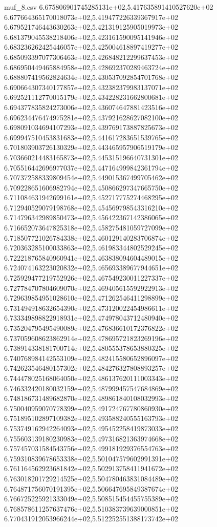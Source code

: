 \begin{filecontents*}{muf_8.csv}
6.675806901745285131e+02,5.417635891410527620e+02
6.677664365170018073e+02,5.419477226339367917e+02
6.679521746443630263e+02,5.421319125905019973e+02
6.681379045538218406e+02,5.423161590095141946e+02
6.683236262425446057e+02,5.425004618897419277e+02
6.685093397077306463e+02,5.426848212299637453e+02
6.686950449465884958e+02,5.428692370289463724e+02
6.688807419562824634e+02,5.430537092854701768e+02
6.690664307340177857e+02,5.432382379983137071e+02
6.692521112770015179e+02,5.434228231662800681e+02
6.694377835824273006e+02,5.436074647881423516e+02
6.696234476474975281e+02,5.437921628627082100e+02
6.698091034694107293e+02,5.439769173887825673e+02
6.699947510453831683e+02,5.441617283651539765e+02
6.701803903726130329e+02,5.443465957906519179e+02
6.703660214483165873e+02,5.445315196640731301e+02
6.705516442696977037e+02,5.447164999842361794e+02
6.707372588339809454e+02,5.449015367499705462e+02
6.709228651606982794e+02,5.450866297347665750e+02
6.711084631942699161e+02,5.452717775274468295e+02
6.712940529079198768e+02,5.454569798543316210e+02
6.714796342989850473e+02,5.456422367142386065e+02
6.716652073647825318e+02,5.458275481059727099e+02
6.718507721026784338e+02,5.460129140283706874e+02
6.720363285100033863e+02,5.461983344802529245e+02
6.722218765840960941e+02,5.463838094604489015e+02
6.724074163223020832e+02,5.465693389677944651e+02
6.725929477219752926e+02,5.467549230011227337e+02
6.727784707804609070e+02,5.469405615592922913e+02
6.729639854951028610e+02,5.471262546411298899e+02
6.731494918632654390e+02,5.473120022454986611e+02
6.733349898822918931e+02,5.474978043712480940e+02
6.735204795495490089e+02,5.476836610172376822e+02
6.737059608623862914e+02,5.478695721823269196e+02
6.738914338181700714e+02,5.480555378653880325e+02
6.740768984142553109e+02,5.482415580652896097e+02
6.742623546480157302e+02,5.484276327808893257e+02
6.744478025168064050e+02,5.486137620111003343e+02
6.746332420180032159e+02,5.487999457547684869e+02
6.748186731489682870e+02,5.489861840108032993e+02
6.750040959070778399e+02,5.491724767780860930e+02
6.751895102897109382e+02,5.493588240555163793e+02
6.753749162942264093e+02,5.495452258419873033e+02
6.755603139180230983e+02,5.497316821363974668e+02
6.757457031584543756e+02,5.499181929376554763e+02
6.759310839678653338e+02,5.501047579602991391e+02
6.761164562923681842e+02,5.502913758411941672e+02
6.763018201729214525e+02,5.504780463831084489e+02
6.764871756070191395e+02,5.506647695849387674e+02
6.766725225921333049e+02,5.508515454455755389e+02
6.768578611257637476e+02,5.510383739639000851e+02
6.770431912053966244e+02,5.512252551388173742e+02

\end{filecontents*}
